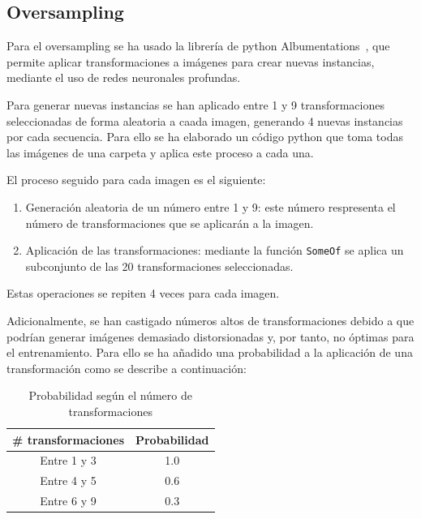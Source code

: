 \documentclass[12pt]{report} %
\begin{document}
    \subsection{Oversampling}

    Para el oversampling se ha usado la librería de python
    Albumentations~\cite{albumentations}, que permite aplicar transformaciones a imágenes
    para crear nuevas instancias, mediante el uso de redes neuronales profundas.
    
    Para generar nuevas instancias se han aplicado entre 1 y 9 transformaciones
    seleccionadas de forma aleatoria a caada imagen, generando 4
    nuevas instancias por cada secuencia. Para ello se ha elaborado un código
    python que toma todas las imágenes de una carpeta y aplica este proceso a
    cada una.

    El proceso seguido para cada imagen es el siguiente: 
    \begin{enumerate}
        \item Generación aleatoria de un número entre 1 y 9: este número respresenta el número de transformaciones que se aplicarán a la imagen.
        \item Aplicación de las transformaciones: mediante la función \texttt{SomeOf} se aplica un subconjunto de las 20 transformaciones seleccionadas.
    \end{enumerate}
    Estas operaciones se repiten 4 veces para cada imagen.

    Adicionalmente, se han castigado números altos de transformaciones debido a
    que podrían generar imágenes demasiado distorsionadas y, por tanto, no
    óptimas para el entrenamiento. Para ello se ha añadido una probabilidad a
    la aplicación de una transformación como se describe a continuación:

    \begin{table}[H]
    \centering
        \begin{tabular}{cc}
        \toprule
        \textbf{\# transformaciones} & \textbf{Probabilidad} \\
        \midrule
        Entre 1 y 3 & 1.0\\
        Entre 4 y 5 & 0.6\\
        Entre 6 y 9 & 0.3\\
        \bottomrule
        \end{tabular}
    \caption{Probabilidad según el número de transformaciones}
    \end{table}

\end{document}
